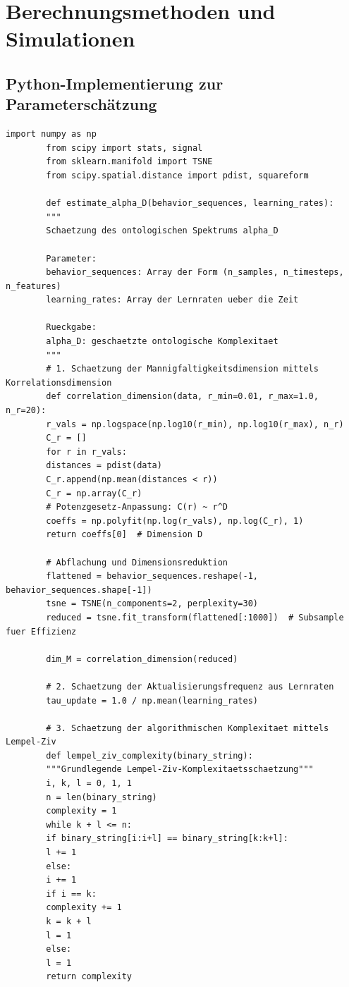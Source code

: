 \documentclass[12pt,a4paper]{article}
\begin{document}
	\section{Berechnungsmethoden und Simulationen}
	
	\subsection{Python-Implementierung zur Parameterschätzung}
	
	\begin{lstlisting}[caption={Python-Code zur Schätzung von UCD-Parametern aus Zeitreihendaten}, label={lst:ucd-python}]
		import numpy as np
		from scipy import stats, signal
		from sklearn.manifold import TSNE
		from scipy.spatial.distance import pdist, squareform
		
		def estimate_alpha_D(behavior_sequences, learning_rates):
		"""
		Schaetzung des ontologischen Spektrums alpha_D
		
		Parameter:
		behavior_sequences: Array der Form (n_samples, n_timesteps, n_features)
		learning_rates: Array der Lernraten ueber die Zeit
		
		Rueckgabe:
		alpha_D: geschaetzte ontologische Komplexitaet
		"""
		# 1. Schaetzung der Mannigfaltigkeitsdimension mittels Korrelationsdimension
		def correlation_dimension(data, r_min=0.01, r_max=1.0, n_r=20):
		r_vals = np.logspace(np.log10(r_min), np.log10(r_max), n_r)
		C_r = []
		for r in r_vals:
		distances = pdist(data)
		C_r.append(np.mean(distances < r))
		C_r = np.array(C_r)
		# Potenzgesetz-Anpassung: C(r) ~ r^D
		coeffs = np.polyfit(np.log(r_vals), np.log(C_r), 1)
		return coeffs[0]  # Dimension D
		
		# Abflachung und Dimensionsreduktion
		flattened = behavior_sequences.reshape(-1, behavior_sequences.shape[-1])
		tsne = TSNE(n_components=2, perplexity=30)
		reduced = tsne.fit_transform(flattened[:1000])  # Subsample fuer Effizienz
		
		dim_M = correlation_dimension(reduced)
		
		# 2. Schaetzung der Aktualisierungsfrequenz aus Lernraten
		tau_update = 1.0 / np.mean(learning_rates)
		
		# 3. Schaetzung der algorithmischen Komplexitaet mittels Lempel-Ziv
		def lempel_ziv_complexity(binary_string):
		"""Grundlegende Lempel-Ziv-Komplexitaetsschaetzung"""
		i, k, l = 0, 1, 1
		n = len(binary_string)
		complexity = 1
		while k + l <= n:
		if binary_string[i:i+l] == binary_string[k:k+l]:
		l += 1
		else:
		i += 1
		if i == k:
		complexity += 1
		k = k + l
		l = 1
		else:
		l = 1
		return complexity
		

\end{lstlisting}
\end{document}
